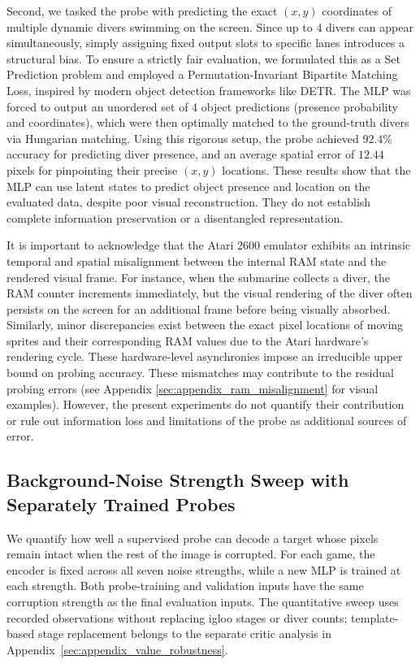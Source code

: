 \documentclass{article} %
\begin{document}
Second, we tasked the probe with predicting the exact $(x, y)$ coordinates of multiple dynamic divers swimming on the screen. Since up to 4 divers can appear simultaneously, simply assigning fixed output slots to specific lanes introduces a structural bias. To ensure a strictly fair evaluation, we formulated this as a Set Prediction problem and employed a Permutation-Invariant Bipartite Matching Loss, inspired by modern object detection frameworks like DETR. The MLP was forced to output an unordered set of 4 object predictions (presence probability and coordinates), which were then optimally matched to the ground-truth divers via Hungarian matching. Using this rigorous setup, the probe achieved $92.4\%$ accuracy for predicting diver presence, and an average spatial error of $12.44$ pixels for pinpointing their precise $(x, y)$ locations. These results show that the MLP can use latent states to predict object presence and location on the evaluated data, despite poor visual reconstruction. They do not establish complete information preservation or a disentangled representation.

It is important to acknowledge that the Atari 2600 emulator exhibits an intrinsic temporal and spatial misalignment between the internal RAM state and the rendered visual frame. For instance, when the submarine collects a diver, the RAM counter increments immediately, but the visual rendering of the diver often persists on the screen for an additional frame before being visually absorbed. Similarly, minor discrepancies exist between the exact pixel locations of moving sprites and their corresponding RAM values due to the Atari hardware's rendering cycle. These hardware-level asynchronies impose an irreducible upper bound on probing accuracy. These mismatches may contribute to the residual probing errors (see Appendix \ref{sec:appendix_ram_misalignment} for visual examples). However, the present experiments do not quantify their contribution or rule out information loss and limitations of the probe as additional sources of error.

\subsection{Background-Noise Strength Sweep with Separately Trained Probes}
\label{subsec:appendix_noise_sweep}
We quantify how well a supervised probe can decode a target whose pixels remain intact when the rest of the image is corrupted. For each game, the encoder is fixed across all seven noise strengths, while a new MLP is trained at each strength. Both probe-training and validation inputs have the same corruption strength as the final evaluation inputs. The quantitative sweep uses recorded observations without replacing igloo stages or diver counts; template-based stage replacement belongs to the separate critic analysis in Appendix~\ref{sec:appendix_value_robustness}.
\end{document}
